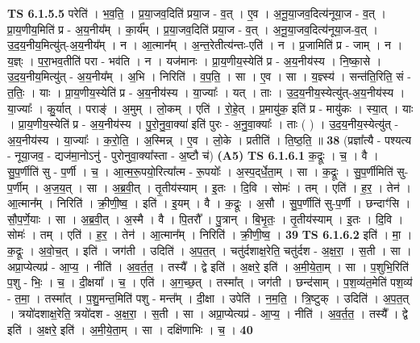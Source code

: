 \documentclass[17pt]{extarticle}
\begin{document}
                  \newline
                                \textbf{ TS 6.1.5.5} \newline
                  परेति॑ । भ॒व॒ति॒ । प्र॒या॒जव॒दिति॑ प्रया॒ज - व॒त् । ए॒व । अ॒नू॒या॒जव॒दित्य॑नूया॒ज - व॒त् । प्रा॒य॒णीय॒मिति॑ प्र - अ॒य॒नीय᳚म् । का॒र्य᳚म् । प्र॒या॒जव॒दिति॑ प्रया॒ज - व॒त् । अ॒नू॒या॒जव॒दित्य॑नूया॒ज-व॒त् । उ॒द॒य॒नीय॒मित्यु॑त्-अ॒य॒नीय᳚म् । न । आ॒त्मान᳚म् । अ॒न्त॒रेतीत्य॑न्तः-एति॑ । न । प्र॒जामिति॑ प्र - जाम् । न । य॒ज्ञ्ः । प॒रा॒भव॒तीति॑ परा - भव॑ति । न । यज॑मानः । प्रा॒य॒णीय॒स्येति॑ प्र - अ॒य॒नीय॑स्य । नि॒ष्का॒से । उ॒द॒य॒नीय॒मित्यु॑त् - अ॒य॒नीय᳚म् । अ॒भि । निरिति॑ । व॒प॒ति॒ । सा । ए॒व । सा । य॒ज्ञ्स्य॑ । सन्त॑ति॒रिति॒ सं - त॒तिः॒ । याः । प्रा॒य॒णीय॒स्येति॑ प्र - अ॒य॒नीय॑स्य । या॒ज्याः᳚ । यत् । ताः । उ॒द॒य॒नीय॒स्येत्यु॑त्-अ॒य॒नीय॑स्य । या॒ज्याः᳚ । कु॒र्यात् । पराङ्॑ । अ॒मुम् । लो॒कम् । एति॑ । रो॒हे॒त् । प्र॒मायु॑क॒ इति॑ प्र - मायु॑कः । स्या॒त् । याः । प्रा॒य॒णीय॒स्येति॑ प्र - अ॒य॒नीय॑स्य । पु॒रो॒नु॒वा॒क्या॑ इति॑ पुरः - अ॒नु॒वा॒क्याः᳚ । ताः ( ) । उ॒द॒य॒नीय॒स्येत्यु॑त् - अ॒य॒नीय॑स्य । या॒ज्याः᳚ । क॒रो॒ति॒ । अ॒स्मिन्न् । ए॒व । लो॒के । प्रतीति॑ । ति॒ष्ठ॒ति॒ ॥ \textbf{  38} \newline
                  \newline
                      (प्रज्ञा᳚त्यै - पश्यत्य - नूया॒जव॒ - द्यज॑मा॒नोऽनु॑ - पुरोनुवा॒क्या᳚स्ता - अ॒ष्टौ च॑)  \textbf{(A5)} \newline \newline
                                \textbf{ TS 6.1.6.1} \newline
                  क॒द्रूः । च॒ । वै । सु॒प॒र्णीति॑ सु - प॒र्णी । च॒ । आ॒त्म॒रू॒पयो॒रित्या᳚त्म - रू॒पयोः᳚ । अ॒स्प॒द्‌र्धे॒ता॒म् । सा । क॒द्रूः । सु॒प॒र्णीमिति॑ सु-प॒र्णीम् । अ॒ज॒य॒त् । सा । अ॒ब्र॒वी॒त् । तृ॒तीय॑स्याम् । इ॒तः । दि॒वि । सोमः॑ । तम् । एति॑ । ह॒र॒ । तेन॑ । आ॒त्मान᳚म् । निरिति॑ । क्री॒णी॒ष्व॒ । इति॑ । इ॒यम् । वै । क॒द्रूः । अ॒सौ । सु॒प॒र्णीति॑ सु-प॒र्णी । छन्दाꣳ॑सि । सौ॒प॒र्णे॒याः । सा । अ॒ब्र॒वी॒त् । अ॒स्मै । वै । पि॒तरौ᳚ । पु॒त्रान् । बि॒भृ॒तः॒ । तृ॒तीय॑स्याम् । इ॒तः । दि॒वि । सोमः॑ । तम् । एति॑ । ह॒र॒ । तेन॑ । आ॒त्मान᳚म् । निरिति॑ । क्री॒णी॒ष्व॒ । \textbf{  39} \newline
                  \newline
                                \textbf{ TS 6.1.6.2} \newline
                  इति॑ । मा॒ । क॒द्रूः । अ॒वो॒च॒त् । इति॑ । जग॑ती । उदिति॑ । अ॒प॒त॒त् । चतु॑र्दशाक्ष॒रेति॒ चतु॑र्दश -   अ॒क्ष॒रा॒ । स॒ती । सा । अप्रा॒प्येत्यप्र॑ - आ॒प्य॒ । नीति॑ । अ॒व॒र्त॒त॒ । तस्यै᳚ । द्वे इति॑ । अ॒क्षरे॒ इति॑ । अ॒मी॒ये॒ता॒म् । सा । प॒शुभि॒रिति॑ प॒शु - भिः॒ । च॒ । दी॒क्षया᳚ । च॒ । एति॑ । अ॒ग॒च्छ॒त् । तस्मा᳚त् । जग॑ती । छन्द॑साम् । प॒श॒व्य॑त॒मेति॑ पश॒व्य॑ - त॒मा॒ । तस्मा᳚त् । प॒शु॒मन्त॒मिति॑ पशु - मन्त᳚म् । दी॒क्षा । उपेति॑ । न॒म॒ति॒ । त्रि॒ष्टुक् । उदिति॑ । अ॒प॒त॒त् । त्रयो॑दशाक्ष॒रेति॒ त्रयो॑दश - अ॒क्ष॒रा॒ । स॒ती । सा । अप्रा॒प्येत्यप्र॑ - आ॒प्य॒ । नीति॑ । अ॒व॒र्त॒त॒ । तस्यै᳚ । द्वे इति॑ । अ॒क्षरे॒ इति॑ । अ॒मी॒ये॒ता॒म् । सा । दक्षि॑णाभिः । च॒ । \textbf{  40} \newline
\end{document}
